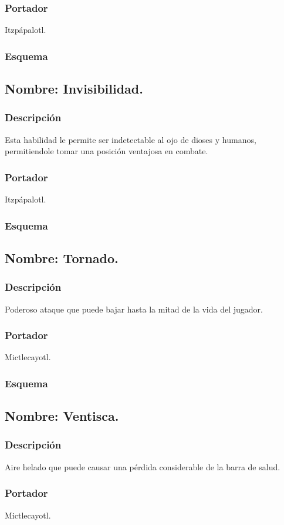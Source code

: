 \documentclass[11pt,letterpaper]{article}
\begin{document}
\subsubsection{Portador}
Itzpápalotl.
\subsubsection{Esquema}
\subsection{Nombre: Invisibilidad.}
\subsubsection{Descripción}
Esta habilidad le permite ser indetectable al ojo de dioses y humanos, permitiendole tomar una posición ventajosa en combate.
\subsubsection{Portador}
Itzpápalotl.
\subsubsection{Esquema}
\subsection{Nombre: Tornado.}
\subsubsection{Descripción}
Poderoso ataque que puede bajar hasta la mitad de la vida del jugador.
\subsubsection{Portador}
Mictlecayotl.
\subsubsection{Esquema}
\subsection{Nombre: Ventisca.}
\subsubsection{Descripción}
Aire helado que puede causar una pérdida considerable de la barra de salud.
\subsubsection{Portador}
Mictlecayotl.
\end{document}
